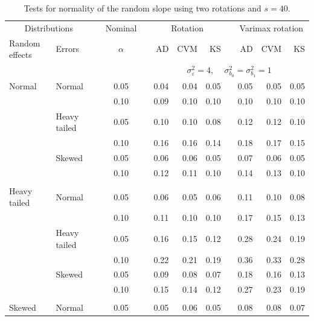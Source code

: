 \documentclass[12pt]{article} %
\begin{document}
\begin{table}[ht]
\caption{Tests for normality of the random slope using two rotations and $s = 40$.}
\begin{scriptsize}
\begin{center}
\begin{tabular}{ll p{.1cm} c p{.1cm} rrr p{.1cm} rrr}
  \hline
  \multicolumn{2}{c}{Distributions}& & Nominal & &  \multicolumn{3}{c}{Rotation} & & \multicolumn{3}{c}{Varimax rotation} \\ \cline{1-2} \cline{6-8} \cline{10-12}   
  Random effects & Errors & & $\alpha$ & & AD & CVM & KS & & AD & CVM & KS \\ 
   \hline
& && && \multicolumn{7}{c}{$\sigma_{\varepsilon}^2 = 4$, \ \ $\sigma_{b_0}^2 = \sigma_{b_1}^2 = 1$} \\ \cline{6-12}
\rowcolor{gray!20}Normal       & Normal       && 0.05 &&  0.04 & 0.04 & 0.05 && 0.05 & 0.05 & 0.05 \\ 
\rowcolor{gray!20}             &              && 0.10 &&  0.09 & 0.10 & 0.10 && 0.10 & 0.10 & 0.10 \\ 
\rowcolor{gray!20}             & Heavy tailed && 0.05 &&  0.10 & 0.10 & 0.08 && 0.12 & 0.12 & 0.10 \\ 
\rowcolor{gray!20}             &              && 0.10 &&  0.16 & 0.16 & 0.14 && 0.18 & 0.17 & 0.15 \\ 
\rowcolor{gray!20}             & Skewed       && 0.05 &&  0.06 & 0.06 & 0.05 && 0.07 & 0.06 & 0.05 \\ 
\rowcolor{gray!20}             &              && 0.10 &&  0.12 & 0.11 & 0.10 && 0.14 & 0.13 & 0.10 \\ 
             &&&&&&&&&&&\\
Heavy tailed & Normal       && 0.05 &&  0.06 & 0.05 & 0.06 && 0.11 & 0.10 & 0.08 \\ 
             &              && 0.10 &&  0.11 & 0.10 & 0.10 && 0.17 & 0.15 & 0.13 \\ 
             & Heavy tailed && 0.05 &&  0.16 & 0.15 & 0.12 && 0.28 & 0.24 & 0.19 \\ 
             &              && 0.10 &&  0.22 & 0.21 & 0.19 && 0.36 & 0.33 & 0.28 \\ 
             & Skewed       && 0.05 &&  0.09 & 0.08 & 0.07 && 0.18 & 0.16 & 0.13 \\ 
             &              && 0.10 &&  0.15 & 0.14 & 0.12 && 0.27 & 0.23 & 0.19 \\ 
             &&&&&&&&&&&\\
Skewed       & Normal       && 0.05 &&  0.05 & 0.06 & 0.05 && 0.08 & 0.08 & 0.07 \\ 

\end{tabular}
\end{center}
\end{scriptsize}
\end{table}
\end{document}
